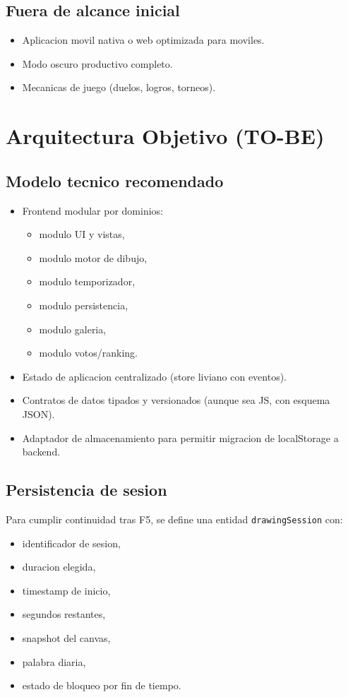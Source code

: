 \documentclass[12pt,a4paper]{article}
\begin{document}
\subsection{Fuera de alcance inicial}
\begin{itemize}
  \item Aplicacion movil nativa o web optimizada para moviles.
  \item Modo oscuro productivo completo.
  \item Mecanicas de juego (duelos, logros, torneos).
\end{itemize}

\section{Arquitectura Objetivo (TO-BE)}
\subsection{Modelo tecnico recomendado}
\begin{itemize}
  \item Frontend modular por dominios:
  \begin{itemize}
    \item modulo UI y vistas,
    \item modulo motor de dibujo,
    \item modulo temporizador,
    \item modulo persistencia,
    \item modulo galeria,
    \item modulo votos/ranking.
  \end{itemize}
  \item Estado de aplicacion centralizado (store liviano con eventos).
  \item Contratos de datos tipados y versionados (aunque sea JS, con esquema JSON).
  \item Adaptador de almacenamiento para permitir migracion de localStorage a backend.
\end{itemize}

\subsection{Persistencia de sesion}
Para cumplir continuidad tras F5, se define una entidad \texttt{drawingSession} con:
\begin{itemize}
  \item identificador de sesion,
  \item duracion elegida,
  \item timestamp de inicio,
  \item segundos restantes,
  \item snapshot del canvas,
  \item palabra diaria,
  \item estado de bloqueo por fin de tiempo.
\end{itemize}
\end{document}
